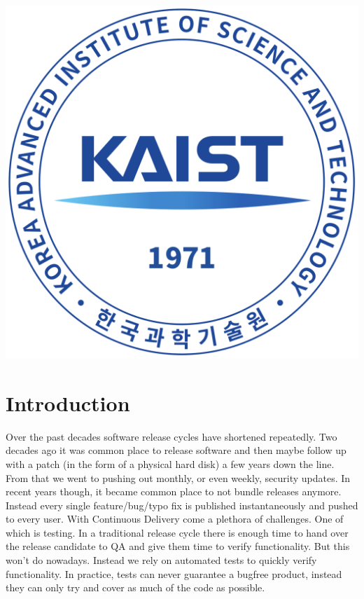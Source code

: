 \documentclass[12pt, a4paper]{article}
\begin{document}
\begin{titlepage}
\includegraphics[scale=0.15]{KAIST.png}\\[1cm]


\vfill %
\end{titlepage}



\section{Introduction}
Over the past decades software release cycles have shortened repeatedly. Two decades ago it was common place to release software and then maybe follow up with a patch (in the form of a physical hard disk) a few years down the line. From that we went to pushing out monthly, or even weekly, security updates. In recent years though, it became common place to not bundle releases anymore. Instead every single feature/bug/typo fix is published instantaneously and pushed to every user. With Continuous Delivery come a plethora of challenges. One of which is testing. In a traditional release cycle there is enough time to hand over the release candidate to QA and give them time to verify functionality. But this won't do nowadays. Instead we rely on automated tests to quickly verify functionality. In practice, tests can never guarantee a bugfree product, instead they can only try and cover as much of the code as possible. 
\end{document}
